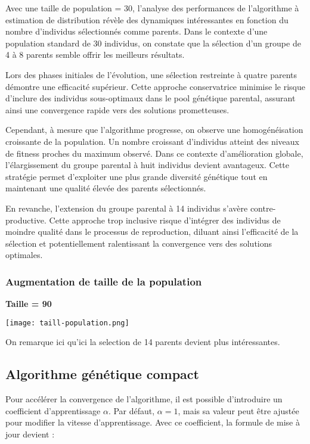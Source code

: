 \documentclass{article}
\begin{document}
Avec une taille de population = 30, l'analyse des performances de l'algorithme à estimation de distribution révèle des dynamiques intéressantes en fonction du nombre d'individus sélectionnés comme parents. Dans le contexte d'une population standard de 30 individus, on constate que la sélection d'un groupe de 4 à 8 parents semble offrir les meilleurs résultats.

Lors des phases initiales de l'évolution, une sélection restreinte à quatre parents démontre une efficacité supérieur. Cette approche conservatrice minimise le risque d'inclure des individus sous-optimaux dans le pool génétique parental, assurant ainsi une convergence rapide vers des solutions prometteuses.

Cependant, à mesure que l'algorithme progresse, on observe une homogénéisation croissante de la population. Un nombre croissant d'individus atteint des niveaux de fitness proches du maximum observé. Dans ce contexte d'amélioration globale, l'élargissement du groupe parental à huit individus devient avantageux. Cette stratégie permet d'exploiter une plus grande diversité génétique tout en maintenant une qualité élevée des parents sélectionnés.


En revanche, l'extension du groupe parental à 14 individus s'avère contre-productive. Cette approche trop inclusive risque d'intégrer des individus de moindre qualité dans le processus de reproduction, diluant ainsi l'efficacité de la sélection et potentiellement ralentissant la convergence vers des solutions optimales.

\subsubsection{Augmentation de taille de la population}
\textbf{Taille = 90}

\texttt{[image: taill-population.png]}

On remarque ici qu'ici la selection de 14 parents devient plus intéressantes.

\subsection{Algorithme génétique compact}

Pour accélérer la convergence de l'algorithme, il est possible d'introduire un coefficient d'apprentissage $\alpha$. Par défaut, $\alpha = 1$, mais sa valeur peut être ajustée pour modifier la vitesse d'apprentissage. Avec ce coefficient, la formule de mise à jour devient :
\end{document}
